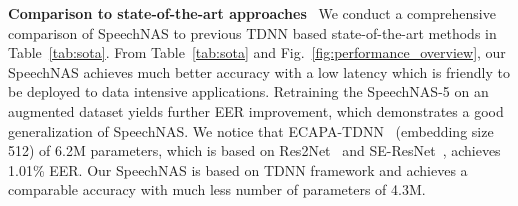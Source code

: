 \documentclass{article}
\begin{document}
\textbf{Comparison to state-of-the-art approaches} \, We conduct a comprehensive comparison of SpeechNAS to previous TDNN based state-of-the-art methods in Table~\ref{tab:sota}. From Table~\ref{tab:sota} and Fig.~\ref{fig:performance_overview}, our SpeechNAS achieves much better accuracy with a low latency which is friendly to be deployed to data intensive applications. Retraining the SpeechNAS-5 on an augmented dataset yields further EER improvement, which demonstrates a good generalization of SpeechNAS. We notice that ECAPA-TDNN~\cite{desplanques2020ecapa} (embedding size 512) of 6.2M parameters, which is based on Res2Net~\cite{gao2019res2net} and SE-ResNet~\cite{hu2018squeeze}, achieves 1.01\% EER. Our SpeechNAS is based on TDNN framework and achieves a comparable accuracy with much less number of parameters of 4.3M.
\end{document}
